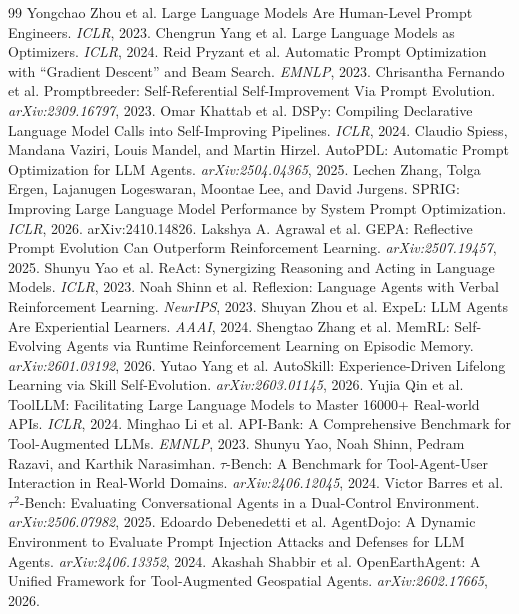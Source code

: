 \documentclass[10pt]{article}
\begin{document}
\begin{thebibliography}{99}
 Yongchao Zhou et al. Large Language Models Are Human-Level Prompt Engineers. \emph{ICLR}, 2023.
 Chengrun Yang et al. Large Language Models as Optimizers. \emph{ICLR}, 2024.
 Reid Pryzant et al. Automatic Prompt Optimization with ``Gradient Descent'' and Beam Search. \emph{EMNLP}, 2023.
 Chrisantha Fernando et al. Promptbreeder: Self-Referential Self-Improvement Via Prompt Evolution. \emph{arXiv:2309.16797}, 2023.
 Omar Khattab et al. DSPy: Compiling Declarative Language Model Calls into Self-Improving Pipelines. \emph{ICLR}, 2024.
 Claudio Spiess, Mandana Vaziri, Louis Mandel, and Martin Hirzel. AutoPDL: Automatic Prompt Optimization for LLM Agents. \emph{arXiv:2504.04365}, 2025.
 Lechen Zhang, Tolga Ergen, Lajanugen Logeswaran, Moontae Lee, and David Jurgens. SPRIG: Improving Large Language Model Performance by System Prompt Optimization. \emph{ICLR}, 2026. arXiv:2410.14826.
 Lakshya A. Agrawal et al. GEPA: Reflective Prompt Evolution Can Outperform Reinforcement Learning. \emph{arXiv:2507.19457}, 2025.
 Shunyu Yao et al. ReAct: Synergizing Reasoning and Acting in Language Models. \emph{ICLR}, 2023.
 Noah Shinn et al. Reflexion: Language Agents with Verbal Reinforcement Learning. \emph{NeurIPS}, 2023.
 Shuyan Zhou et al. ExpeL: LLM Agents Are Experiential Learners. \emph{AAAI}, 2024.
 Shengtao Zhang et al. MemRL: Self-Evolving Agents via Runtime Reinforcement Learning on Episodic Memory. \emph{arXiv:2601.03192}, 2026.
 Yutao Yang et al. AutoSkill: Experience-Driven Lifelong Learning via Skill Self-Evolution. \emph{arXiv:2603.01145}, 2026.
 Yujia Qin et al. ToolLLM: Facilitating Large Language Models to Master 16000+ Real-world APIs. \emph{ICLR}, 2024.
 Minghao Li et al. API-Bank: A Comprehensive Benchmark for Tool-Augmented LLMs. \emph{EMNLP}, 2023.
 Shunyu Yao, Noah Shinn, Pedram Razavi, and Karthik Narasimhan. $\tau$-Bench: A Benchmark for Tool-Agent-User Interaction in Real-World Domains. \emph{arXiv:2406.12045}, 2024.
 Victor Barres et al. $\tau^2$-Bench: Evaluating Conversational Agents in a Dual-Control Environment. \emph{arXiv:2506.07982}, 2025.
 Edoardo Debenedetti et al. AgentDojo: A Dynamic Environment to Evaluate Prompt Injection Attacks and Defenses for LLM Agents. \emph{arXiv:2406.13352}, 2024.
 Akashah Shabbir et al. OpenEarthAgent: A Unified Framework for Tool-Augmented Geospatial Agents. \emph{arXiv:2602.17665}, 2026.
\end{thebibliography}
\end{document}
